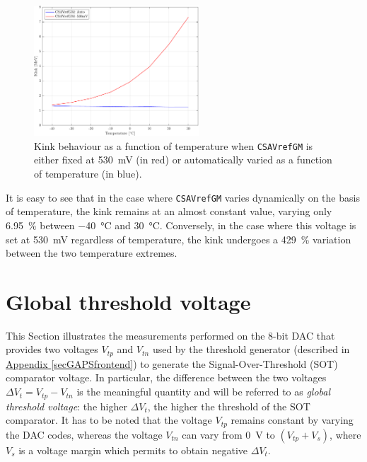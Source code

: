 \begin{figure}[h!]
    \centering
    \includegraphics[width=0.55\textwidth]{Images/chap1/results/FDT/plot_pedestal_gain_auto_530mV.pdf}
    \caption{Kink behaviour as a function of temperature when \texttt{CSAVrefGM} is either fixed at \SI{530}{\milli\volt} (in red) or automatically varied as a function of temperature (in blue).}
    \label{figFDTkinkVariationResult}
\end{figure}

\par
It is easy to see that in the case where \texttt{CSAVrefGM} varies dynamically on the basis of temperature, the kink remains at an almost constant value, varying only \SI{6.95}{\percent} between \SI{-40}{\celsius} and \SI{30}{\celsius}. Conversely, in the case where this voltage is set at \SI{530}{\milli\volt} regardless of temperature, the kink undergoes a \SI{429}{\percent} variation between the two temperature extremes.



\section{Global threshold voltage}
\label{thresholdVoltageANALYSIS}

This Section illustrates the measurements performed on the 8-bit DAC that provides two voltages $V_{\textit{tp}}$ and $V_{\textit{tn}}$ used by the threshold generator (described in \hyperref[secGAPSfrontend]{Appendix \ref{secGAPSfrontend}}) to generate the Signal-Over-Threshold (SOT) comparator voltage. In particular, the difference between the two voltages $\Delta V_{\textit{t}} = V_{\textit{tp}}-V_{\textit{tn}}$ is the meaningful quantity and will be referred to as \textit{global threshold voltage}: the higher $\Delta V_{\textit{t}}$, the higher the threshold of the SOT comparator. It has to be noted that the voltage $V_{\textit{tp}}$ remains constant by varying the DAC codes, whereas the voltage $V_{\textit{tn}}$ can vary from \SI{0}{\volt} to $(V_{\textit{tp}}+V_{\textit{s}})$, where $V_{\textit{s}}$ is a voltage margin which permits to obtain negative $\Delta V_{\textit{t}}$. 

